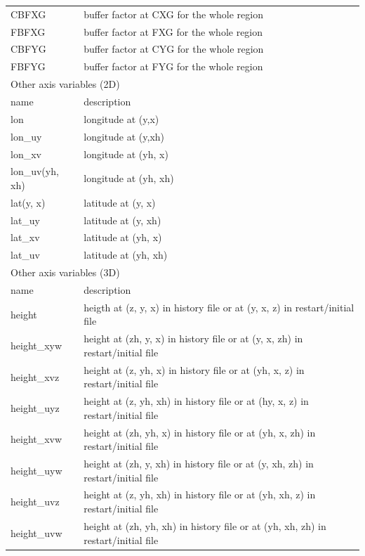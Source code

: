 \begin{longtable}{l|l}
CBFXG & buffer factor at CXG for the whole region \\
FBFXG & buffer factor at FXG for the whole region \\
CBFYG & buffer factor at CYG for the whole region \\
FBFYG & buffer factor at FYG for the whole region \\
\hline
\multicolumn{2}{l}{Other axis variables (2D)}\\ \hline
name & description \\ \hline \hline
lon & longitude at (y,x) \\
lon\_uy & longitude at (y,xh) \\
lon\_xv & longitude at (yh, x) \\
lon\_uv(yh, xh) & longitude at (yh, xh) \\
lat(y, x) & latitude at (y, x) \\
lat\_uy & latitude at (y, xh) \\
lat\_xv & latitude at (yh, x) \\
lat\_uv & latitude at (yh, xh) \\
\hline
\multicolumn{2}{l}{Other axis variables (3D)}\\ \hline
name & description \\ \hline \hline
height & heigth at (z, y, x) in history file or at (y, x, z) in restart/initial file\\
height\_xyw & height at (zh, y, x) in history file or at (y, x, zh) in restart/initial file\\
height\_xvz & height at (z, yh, x) in history file or at (yh, x, z) in restart/initial file\\
height\_uyz & height at (z, yh, xh) in history file or at (hy, x, z) in restart/initial file\\
height\_xvw & height at (zh, yh, x) in history file or at (yh, x, zh) in restart/initial file\\
height\_uyw & height at (zh, y, xh) in history file or at (y, xh, zh) in restart/initial file\\
height\_uvz & height at (z, yh, xh) in history file or at (yh, xh, z) in restart/initial file\\
height\_uvw & height at (zh, yh, xh) in history file or at (yh, xh, zh) in restart/initial file\\
\end{longtable}



